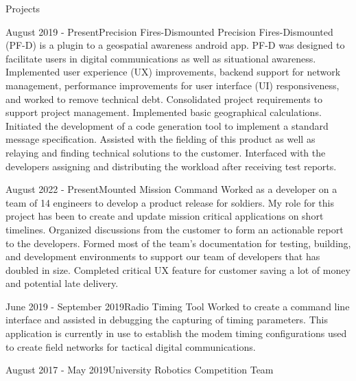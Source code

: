 \documentclass{article}
\newlength{\tabin}
\newlength{\secsep}
\newcommand{\lineunder}{\vspace*{-8pt} \\ \hspace*{-6pt} \hrulefill \\ \vspace*{-15pt}}
\newenvironment{tabbedsection}[1]{
	\begin{list}{}{
			\setlength{\itemsep}{0pt}
			\setlength{\labelsep}{0pt}
			\setlength{\labelwidth}{0pt}
			\setlength{\leftmargin}{0pt}
			\setlength{\rightmargin}{\tabin}
			\setlength{\listparindent}{0pt}
			\setlength{\parsep}{0pt}
			\setlength{\parskip}{0pt}
			\setlength{\partopsep}{0pt}
			\setlength{\topsep}{#1}
		}
		\item[]
	}{\end{list}}
\newenvironment{resume_section}[1]{
	\filbreak
	\vspace{2\secsep}
	\textsc{\color{blue}\large#1}
	\lineunder
	\begin{tabbedsection}{\secsep}
	}{\end{tabbedsection}}
\newenvironment{resume_subsection}[2]{
	\textbf{\color{BlueViolet}#2} \hfill {\normalsize (#1)} \hspace{-5em}
	\begin{tabbedsection}{0.5\secsep}
		\begin{subitems}
		}{\end{subitems}\end{tabbedsection}}
\newenvironment{subitems}{
	\renewcommand{\labelitemi}{-}
	\begin{itemize}
		\setlength{\labelsep}{1em}
	}{\end{itemize}}
\begin{document}
	\vspace{-3\secsep}
	
	\begin{resume_section}{Projects}
		\begin{resume_subsection}{August 2019 - Present}{Precision Fires-Dismounted}
			Precision Fires-Dismounted (PF-D) is a plugin to a geospatial awareness android app. PF-D was designed to facilitate users in digital
			communications as well as situational awareness. Implemented user experience (UX) improvements, backend support for network
			management, performance improvements for user interface (UI) responsiveness, and worked to remove technical debt. Consolidated
			project requirements to support project management. Implemented basic geographical calculations. Initiated the development of a code generation tool to implement a standard message specification. Assisted with the fielding of this product as well as relaying and finding technical solutions to the customer. Interfaced with the developers assigning and distributing the workload after receiving test reports.
		\end{resume_subsection}
		\vspace{2\secsep}
		\begin{resume_subsection}{August 2022 - Present}{Mounted Mission Command}
			Worked as a developer on a team of 14 engineers to develop a product release for soldiers. My role for this project has been to create and update mission critical applications on short timelines. Organized discussions from the customer to form an actionable report to the developers. Formed most of the team’s documentation for testing, building, and development environments to support our team of developers that has doubled in size. Completed critical UX feature for customer saving a lot of money and potential late delivery.
		\end{resume_subsection}
		\vspace{2\secsep}
		\begin{resume_subsection}{June 2019 - September 2019}{Radio Timing Tool}
			Worked to create a command line interface and assisted in debugging the capturing of timing parameters. This application is
			currently in use to establish the modem timing configurations used to create field networks for tactical digital communications.
		\end{resume_subsection}
		\vspace{2\secsep}
		\begin{resume_subsection}{August 2017 - May 2019}{University Robotics Competition Team}

\end{resume_subsection}
\end{resume_section}
\end{document}
